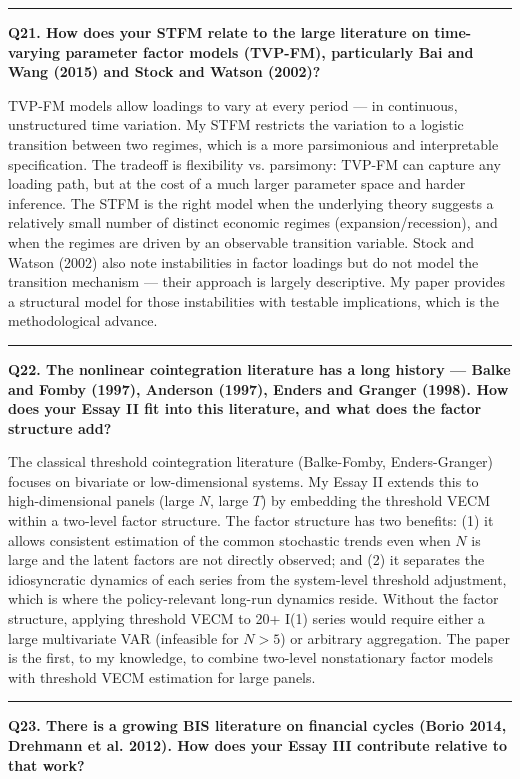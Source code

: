 \documentclass[11pt,a4paper]{article}
\begin{document}
\medskip\hrule\medskip

\textbf{Q21. How does your STFM relate to the large literature on time-varying parameter factor models (TVP-FM), particularly Bai and Wang (2015) and Stock and Watson (2002)?}

TVP-FM models allow loadings to vary at every period — in continuous, unstructured time variation. My STFM restricts the variation to a logistic transition between two regimes, which is a more parsimonious and interpretable specification. The tradeoff is flexibility vs. parsimony: TVP-FM can capture any loading path, but at the cost of a much larger parameter space and harder inference. The STFM is the right model when the underlying theory suggests a relatively small number of distinct economic regimes (expansion/recession), and when the regimes are driven by an observable transition variable. Stock and Watson (2002) also note instabilities in factor loadings but do not model the transition mechanism — their approach is largely descriptive. My paper provides a structural model for those instabilities with testable implications, which is the methodological advance.

\medskip\hrule\medskip

\textbf{Q22. The nonlinear cointegration literature has a long history — Balke and Fomby (1997), Anderson (1997), Enders and Granger (1998). How does your Essay II fit into this literature, and what does the factor structure add?}

The classical threshold cointegration literature (Balke-Fomby, Enders-Granger) focuses on bivariate or low-dimensional systems. My Essay II extends this to high-dimensional panels (large $N$, large $T$) by embedding the threshold VECM within a two-level factor structure. The factor structure has two benefits: (1) it allows consistent estimation of the common stochastic trends even when $N$ is large and the latent factors are not directly observed; and (2) it separates the idiosyncratic dynamics of each series from the system-level threshold adjustment, which is where the policy-relevant long-run dynamics reside. Without the factor structure, applying threshold VECM to 20+ I(1) series would require either a large multivariate VAR (infeasible for $N > 5$) or arbitrary aggregation. The paper is the first, to my knowledge, to combine two-level nonstationary factor models with threshold VECM estimation for large panels.

\medskip\hrule\medskip

\textbf{Q23. There is a growing BIS literature on financial cycles (Borio 2014, Drehmann et al. 2012). How does your Essay III contribute relative to that work?}
\end{document}
